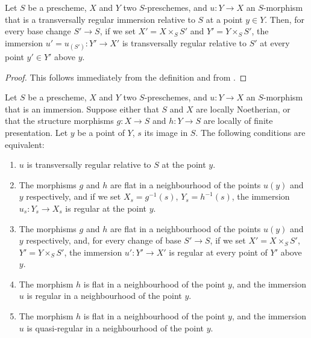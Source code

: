\begin{proposition}[19.2.3]
\label{IV.19.2.3}
Let $S$ be a prescheme, $X$ and $Y$ two $S$-preschemes, and $u:Y\to X$ an $S$-morphism that is a transversally regular immersion relative to $S$ at a point $y\in Y$.
Then, for every base change $S'\to S$, if we set $X'=X\times_S S'$ and $Y'=Y\times_S S'$, the immersion $u'=u_{(S')}:Y'\to X'$ is transversally regular relative to $S'$ at every point $y'\in Y'$ above $y$.
\end{proposition}

\begin{proof}
This follows immediately from the definition and from .
\end{proof}

\begin{proposition}[19.2.4]
\label{IV.19.2.4}
Let $S$ be a prescheme, $X$ and $Y$ two $S$-preschemes, and $u:Y\to X$ an $S$-morphism that is an immersion.
Suppose either that $S$ and $X$ are locally Noetherian, or that the structure morphisms $g:X\to S$ and $h:Y\to S$ are locally of finite presentation.
Let $y$ be a point of $Y$, $s$ its image in $S$.
The following conditions are equivalent:
\begin{enumerate}[label=\emph{\alph*)}]
  \item $u$ is transversally regular relative to $S$ at the point $y$.
  \item The morphisms $g$ and $h$ are flat in a neighbourhood of the points $u(y)$ and $y$ respectively, and if we set $X_s=g^{-1}(s)$, $Y_s=h^{-1}(s)$, the immersion $u_s:Y_s\to X_s$ is regular at the point $y$.
  \item[\rm b$'$)] The morphisms $g$ and $h$ are flat in a neighbourhood of the points $u(y)$ and $y$ respectively, and, for every change of base $S'\to S$, if we set $X'=X\times_S S'$, $Y'=Y\times_S S'$, the immersion $u':Y'\to X'$ is regular at every point of $Y'$ above $y$.
  \item The morphism $h$ is flat in a neighbourhood of the point $y$, and the immersion $u$ is regular in a neighbourhood of the point $y$.
  \item[\rm c$'$)] The morphism $h$ is flat in a neighbourhood of the point $y$, and the immersion $u$ is quasi-regular in a neighbourhood of the point $y$.
\end{enumerate}
\end{proposition}

